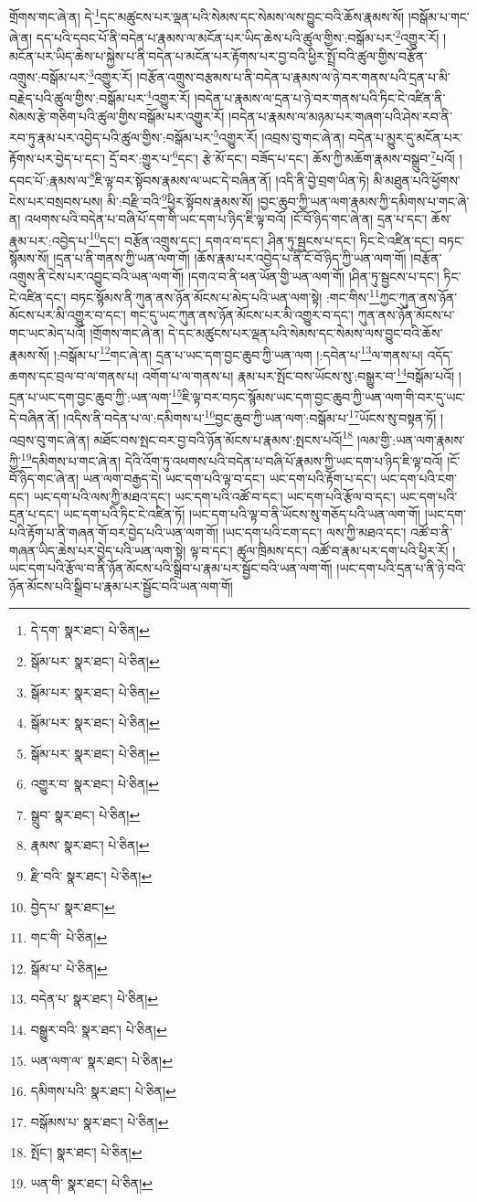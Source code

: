 གྲོགས་གང་ཞེ་ན། དེ་\footnote{དེ་དག་  སྣར་ཐང་།  པེ་ཅིན། }དང་མཚུངས་པར་ལྡན་པའི་སེམས་དང་སེམས་ལས་བྱུང་བའི་ཆོས་རྣམས་སོ། །བསྒོམ་པ་གང་ཞེ་ན། དད་པའི་དབང་པོ་ནི་བདེན་པ་རྣམས་ལ་མངོན་པར་ཡིད་ཆེས་པའི་ཚུལ་གྱིས་:བསྒོམ་པར་\footnote{སྒོམ་པར་  སྣར་ཐང་།  པེ་ཅིན། }འགྱུར་རོ། །མངོན་པར་ཡིད་ཆེས་པ་སྐྱེས་པ་ནི་བདེན་པ་མངོན་པར་རྟོགས་པར་བྱ་བའི་ཕྱིར་སྤྲོ་བའི་ཚུལ་གྱིས་བརྩོན་འགྲུས་:བསྒོམ་པར་\footnote{སྒོམ་པར་  སྣར་ཐང་།  པེ་ཅིན། }འགྱུར་རོ། །བརྩོན་འགྲུས་བརྩམས་པ་ནི་བདེན་པ་རྣམས་ལ་ཉེ་བར་གནས་པའི་དྲན་པ་མི་བརྗེད་པའི་ཚུལ་གྱིས་:བསྒོམ་པར་\footnote{སྒོམ་པར་  སྣར་ཐང་།  པེ་ཅིན། }འགྱུར་རོ། །བདེན་པ་རྣམས་ལ་དྲན་པ་ཉེ་བར་གནས་པའི་ཏིང་ངེ་འཛིན་ནི་སེམས་རྩེ་གཅིག་པའི་ཚུལ་གྱིས་བསྒོམ་པར་འགྱུར་རོ། །བདེན་པ་རྣམས་ལ་མཉམ་པར་གཞག་པའི་ཤེས་རབ་ནི་རབ་ཏུ་རྣམ་པར་འབྱེད་པའི་ཚུལ་གྱིས་:བསྒོམ་པར་\footnote{སྒོམ་པར་  སྣར་ཐང་།  པེ་ཅིན། }འགྱུར་རོ། །འབྲས་བུ་གང་ཞེ་ན། བདེན་པ་མྱུར་དུ་མངོན་པར་རྟོགས་པར་བྱེད་པ་དང་། དྲོ་བར་:གྱུར་པ་\footnote{འགྱུར་བ་  སྣར་ཐང་།  པེ་ཅིན། }དང་། རྩེ་མོ་དང་། བཟོད་པ་དང་། ཆོས་ཀྱི་མཆོག་རྣམས་བསྒྲུབ་\footnote{སྒྲུབ་  སྣར་ཐང་།  པེ་ཅིན། }པའོ། །དབང་པོ་:རྣམས་ལ་\footnote{རྣམས་  སྣར་ཐང་།  པེ་ཅིན། }ཇི་ལྟ་བར་སྟོབས་རྣམས་ལ་ཡང་དེ་བཞིན་ནོ། །འདི་ནི་བྱེ་བྲག་ཡིན་ཏེ། མི་མཐུན་པའི་ཕྱོགས་ངེས་པར་བསྲབས་པས། མི་:བརྫི་བའི་\footnote{རྫི་བའི་  སྣར་ཐང་།  པེ་ཅིན། }ཕྱིར་སྟོབས་རྣམས་སོ། །བྱང་ཆུབ་ཀྱི་ཡན་ལག་རྣམས་ཀྱི་དམིགས་པ་གང་ཞེ་ན། འཕགས་པའི་བདེན་པ་བཞི་པོ་དག་གི་ཡང་དག་པ་ཉིད་ཇི་ལྟ་བའོ། །ངོ་བོ་ཉིད་གང་ཞེ་ན། དྲན་པ་དང་། ཆོས་རྣམ་པར་:འབྱེད་པ་\footnote{བྱེད་པ་  སྣར་ཐང་། }དང་། བརྩོན་འགྲུས་དང་། དགའ་བ་དང་། ཤིན་ཏུ་སྦྱངས་པ་དང་། ཏིང་ངེ་འཛིན་དང་། བཏང་སྙོམས་སོ། །དྲན་པ་ནི་གནས་ཀྱི་ཡན་ལག་གོ། །ཆོས་རྣམ་པར་འབྱེད་པ་ནི་ངོ་བོ་ཉིད་ཀྱི་ཡན་ལག་གོ། །བརྩོན་འགྲུས་ནི་ངེས་པར་འབྱུང་བའི་ཡན་ལག་གོ། །དགའ་བ་ནི་ཕན་ཡོན་གྱི་ཡན་ལག་གོ། །ཤིན་ཏུ་སྦྱངས་པ་དང་། ཏིང་ངེ་འཛིན་དང་། བཏང་སྙོམས་ནི་ཀུན་ནས་ཉོན་མོངས་པ་མེད་པའི་ཡན་ལག་སྟེ། :གང་གིས་\footnote{གང་གི་  པེ་ཅིན། }ཀྱང་ཀུན་ནས་ཉོན་མོངས་པར་མི་འགྱུར་བ་དང་། གང་དུ་ཡང་ཀུན་ནས་ཉོན་མོངས་པར་མི་འགྱུར་བ་དང་། ཀུན་ནས་ཉོན་མོངས་པ་གང་ཡང་མེད་པའོ། །གྲོགས་གང་ཞེ་ན། དེ་དང་མཚུངས་པར་ལྡན་པའི་སེམས་དང་སེམས་ལས་བྱུང་བའི་ཆོས་རྣམས་སོ། །:བསྒོམ་པ་\footnote{སྒོམ་པ་  པེ་ཅིན། }གང་ཞེ་ན། དྲན་པ་ཡང་དག་བྱང་ཆུབ་ཀྱི་ཡན་ལག །:དབེན་པ་\footnote{བདེན་པ་  སྣར་ཐང་།  པེ་ཅིན། }ལ་གནས་པ། འདོད་ཆགས་དང་བྲལ་བ་ལ་གནས་པ། འགོག་པ་ལ་གནས་པ། རྣམ་པར་སྤོང་བས་ཡོངས་སུ་:བསྒྱུར་བ་\footnote{བསྒྱུར་བའི་  སྣར་ཐང་།  པེ་ཅིན། }བསྒོམ་པའོ། །དྲན་པ་ཡང་དག་བྱང་ཆུབ་ཀྱི་:ཡན་ལག་\footnote{ཡན་ལག་ལ་  སྣར་ཐང་།  པེ་ཅིན། }ཇི་ལྟ་བར་བཏང་སྙོམས་ཡང་དག་བྱང་ཆུབ་ཀྱི་ཡན་ལག་གི་བར་དུ་ཡང་དེ་བཞིན་ནོ། །འདིས་ནི་བདེན་པ་ལ་:དམིགས་པ་\footnote{དམིགས་པའི་  སྣར་ཐང་།  པེ་ཅིན། }བྱང་ཆུབ་ཀྱི་ཡན་ལག་:བསྒོམ་པ་\footnote{བསྒོམས་པ་  སྣར་ཐང་།  པེ་ཅིན། }ཡོངས་སུ་བསྟན་ཏོ། །འབྲས་བུ་གང་ཞེ་ན། མཐོང་བས་སྤང་བར་བྱ་བའི་ཉོན་མོངས་པ་རྣམས་:སྤངས་པའོ།\footnote{སྤོང་།  སྣར་ཐང་།  པེ་ཅིན། } །ལམ་གྱི་:ཡན་ལག་རྣམས་ཀྱི་\footnote{ཡན་གི་  སྣར་ཐང་།  པེ་ཅིན། }དམིགས་པ་གང་ཞེ་ན། དེའི་འོག་ཏུ་འཕགས་པའི་བདེན་པ་བཞི་པོ་རྣམས་ཀྱི་ཡང་དག་པ་ཉིད་ཇི་ལྟ་བའོ། །ངོ་བོ་ཉིད་གང་ཞེ་ན། ཡན་ལག་བརྒྱད་དེ། ཡང་དག་པའི་ལྟ་བ་དང་། ཡང་དག་པའི་རྟོག་པ་དང་། ཡང་དག་པའི་ངག་དང་། ཡང་དག་པའི་ལས་ཀྱི་མཐའ་དང་། ཡང་དག་པའི་འཚོ་བ་དང་། ཡང་དག་པའི་རྩོལ་བ་དང་། ཡང་དག་པའི་དྲན་པ་དང་། ཡང་དག་པའི་ཏིང་ངེ་འཛིན་ཏོ། །ཡང་དག་པའི་ལྟ་བ་ནི་ཡོངས་སུ་གཅོད་པའི་ཡན་ལག་གོ། །ཡང་དག་པའི་རྟོག་པ་ནི་གཞན་གོ་བར་བྱེད་པའི་ཡན་ལག་གོ། །ཡང་དག་པའི་ངག་དང་། ལས་ཀྱི་མཐའ་དང་། འཚོ་བ་ནི་གཞན་ཡིད་ཆེས་པར་བྱེད་པའི་ཡན་ལག་སྟེ། ལྟ་བ་དང་། ཚུལ་ཁྲིམས་དང་། འཚོ་བ་རྣམ་པར་དག་པའི་ཕྱིར་རོ། །ཡང་དག་པའི་རྩོལ་བ་ནི་ཉོན་མོངས་པའི་སྒྲིབ་པ་རྣམ་པར་སྦྱོང་བའི་ཡན་ལག་གོ། །ཡང་དག་པའི་དྲན་པ་ནི་ཉེ་བའི་ཉོན་མོངས་པའི་སྒྲིབ་པ་རྣམ་པར་སྦྱོང་བའི་ཡན་ལག་གོ། 